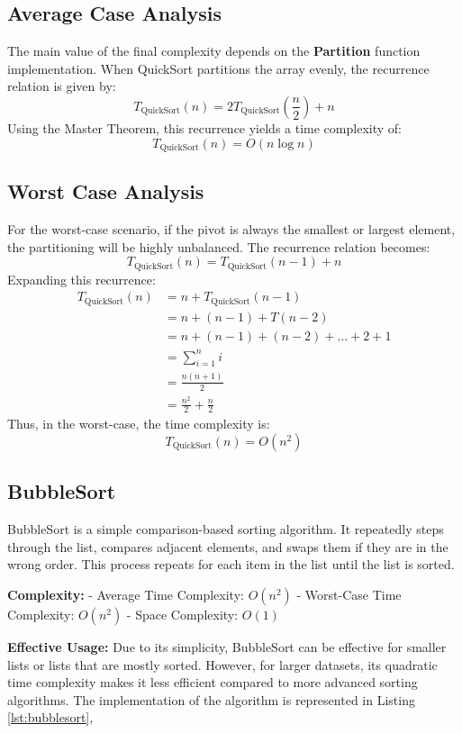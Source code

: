 \subsection{Average Case Analysis}
The main value of the final complexity depends on the \textbf{Partition} function implementation.
When QuickSort partitions the array evenly, the recurrence relation is given by:
\[
T_{\text{QuickSort}}(n) = 2T_{\text{QuickSort}}\left(\frac{n}{2}\right) + n
\]
Using the Master Theorem, this recurrence yields a time complexity of:
\[
T_{\text{QuickSort}}(n) = O(n \log n)
\]

\subsection{Worst Case Analysis}
For the worst-case scenario, if the pivot is always the smallest or largest element, the partitioning will be highly unbalanced. The recurrence relation becomes:
\[
T_{\text{QuickSort}}(n) = T_{\text{QuickSort}}(n-1) + n
\]
Expanding this recurrence:
\begin{align*}
T_{\text{QuickSort}}(n) & = n + T_{\text{QuickSort}}(n-1) \\
& = n + (n-1) + T(n-2) \\
& = n + (n-1) + (n-2) + \dots + 2 + 1 \\
& = \sum_{i=1}^{n} i \\
& = \frac{n(n+1)}{2} \\
& = \frac{n^2}{2} + \frac{n}{2}
\end{align*}
Thus, in the worst-case, the time complexity is:
\[
T_{\text{QuickSort}}(n) = O(n^2)
\]

\subsection{BubbleSort}

BubbleSort is a simple comparison-based sorting algorithm. It repeatedly steps through the list, compares adjacent elements, and swaps them if they are in the wrong order. This process repeats for each item in the list until the list is sorted.


\textbf{Complexity:}
- Average Time Complexity: \(O(n^2)\)
- Worst-Case Time Complexity: \(O(n^2)\)
- Space Complexity: \(O(1)\)

\textbf{Effective Usage:}
Due to its simplicity, BubbleSort can be effective for smaller lists or lists that are mostly sorted. However, for larger datasets, its quadratic time complexity makes it less efficient compared to more advanced sorting algorithms.  The implementation of the algorithm is represented in Listing \ref{lst:bubblesort},


